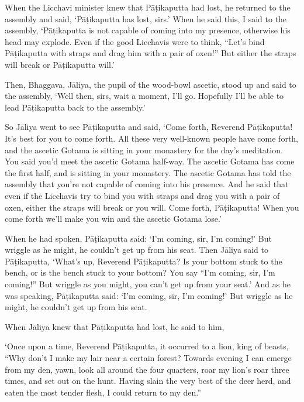 \documentclass[12pt,openany]{book}%
\begin{document}
When the Licchavi minister knew that \textsanskrit{Pāṭikaputta} had lost, he returned to the assembly and said, ‘\textsanskrit{Pāṭikaputta} has lost, sirs.’ When he said this, I said to the assembly, ‘\textsanskrit{Pāṭikaputta} is not capable of coming into my presence, otherwise his head may explode. Even if the good Licchavis were to think, “Let’s bind \textsanskrit{Pāṭikaputta} with straps and drag him with a pair of oxen!” But either the straps will break or \textsanskrit{Pāṭikaputta} will.’ 

Then, Bhaggava, \textsanskrit{Jāliya}, the pupil of the wood-bowl ascetic, stood up and said to the assembly, ‘Well then, sirs, wait a moment, I’ll go. Hopefully I’ll be able to lead \textsanskrit{Pāṭikaputta} back to the assembly.’ 

So \textsanskrit{Jāliya} went to see \textsanskrit{Pāṭikaputta} and said, ‘Come forth, Reverend \textsanskrit{Pāṭikaputta}! It’s best for you to come forth. All these very well-known people have come forth, and the ascetic Gotama is sitting in your monastery for the day’s meditation. You said you’d meet the ascetic Gotama half-way. The ascetic Gotama has come the first half, and is sitting in your monastery. The ascetic Gotama has told the assembly that you’re not capable of coming into his presence. And he said that even if the Licchavis try to bind you with straps and drag you with a pair of oxen, either the straps will break or you will. Come forth, \textsanskrit{Pāṭikaputta}! When you come forth we’ll make you win and the ascetic Gotama lose.’ 

When he had spoken, \textsanskrit{Pāṭikaputta} said: ‘I’m coming, sir, I’m coming!’ But wriggle as he might, he couldn’t get up from his seat. Then \textsanskrit{Jāliya} said to \textsanskrit{Pāṭikaputta}, ‘What’s up, Reverend \textsanskrit{Pāṭikaputta}? Is your bottom stuck to the bench, or is the bench stuck to your bottom? You say “I’m coming, sir, I’m coming!” But wriggle as you might, you can’t get up from your seat.’ And as he was speaking, \textsanskrit{Pāṭikaputta} said: ‘I’m coming, sir, I’m coming!’ But wriggle as he might, he couldn’t get up from his seat. 

When \textsanskrit{Jāliya} knew that \textsanskrit{Pāṭikaputta} had lost, he said to him, 

‘Once upon a time, Reverend \textsanskrit{Pāṭikaputta}, it occurred to a lion, king of beasts, “Why don’t I make my lair near a certain forest? Towards evening I can emerge from my den, yawn, look all around the four quarters, roar my lion’s roar three times, and set out on the hunt. Having slain the very best of the deer herd, and eaten the most tender flesh, I could return to my den.” 
\end{document}
